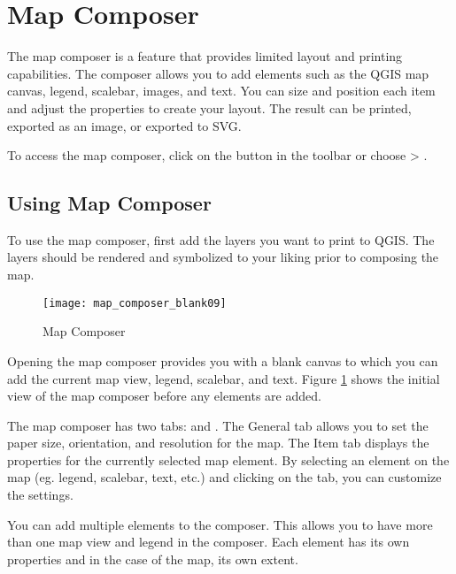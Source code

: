 
\section{Map Composer}\label{label_mapcomposer}

The map composer is a feature that provides limited layout and printing
capabilities. The composer allows you to add elements such as the QGIS map
canvas, legend, scalebar, images, and text. You can size and position each item and
adjust the properties to create your layout. The result can be printed,
exported as an image, or exported to SVG.

To access the map composer, click on the 
button in the toolbar or choose  > .

\subsection{Using Map Composer}\label{label_usemapcomposer} 

To use the map composer, first add the layers you
want to print to QGIS. The layers should be rendered and symbolized to your
liking prior to composing the map. 

\begin{figure}[ht]
   \begin{center}
   \caption{Map Composer}\label{fig:map_composer_blank}\smallskip
   \texttt{[image: map\_composer\_blank09]}
\end{center}  
\end{figure}

Opening the map composer provides you with a blank canvas to which you can add
the current map view, legend, scalebar, and text. Figure
\ref{fig:map_composer_blank} shows the initial view of the map composer before
any elements are added.

The map composer has two tabs:  and . The General tab
allows you to set the paper size, orientation, and resolution for the map.
The Item tab displays the properties for the currently selected map element.
By selecting an element on the map (eg. legend, scalebar, text, etc.) and
clicking on the  tab, you can customize the settings.

You can add multiple elements to the composer. This allows you to have more
than one map view and legend in the composer. Each element has its own
properties and in the case of the map, its own extent.

